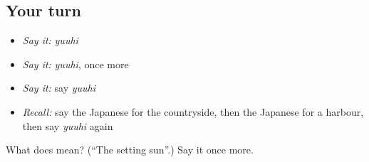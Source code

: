 \subsection*{Your turn}
\begin{itemize}
\raggedright
  \item \emph{Say it:} \emph{yuuhi}
  \item \emph{Say it:} \emph{yuuhi}, once more
  \item \emph{Say it:} say \emph{yuuhi}
  \item \emph{Recall:} say the Japanese for the countryside, then the Japanese for a harbour, then say \emph{yuuhi} again
\end{itemize}

\begin{tcolorbox}[breakable,colback=teal!4,colframe=teal!35!black,title={Before you move on}]
What does  mean? (\textquotedblleft{}The setting sun\textquotedblright{}.) Say it once more.
\end{tcolorbox}
